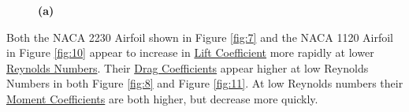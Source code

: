 \documentclass{article}
\begin{document}
\begin{figure}
  \centering
  \caption{ \textbf{(a)} }
  \label{run5}
\end{figure}

Both the NACA 2230 Airfoil shown in Figure \ref{fig:7} and the NACA 1120 Airfoil in Figure \ref{fig:10} appear to increase in \hyperlink{CL}{Lift Coefficient} more rapidly at lower \hyperlink{Re}{Reynolds Numbers}. Their \hyperlink{CD}{Drag Coefficients} appear higher at low Reynolds Numbers in both Figure \ref{fig:8} and Figure \ref{fig:11}. At low Reynolds numbers their \hyperlink{CM}{Moment Coefficients} are both higher, but decrease more quickly.
\end{document}
